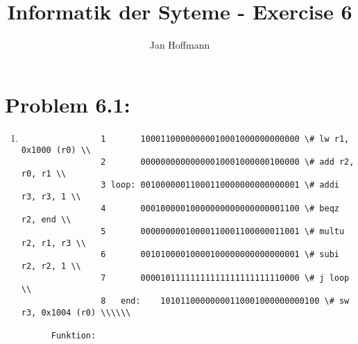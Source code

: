 \documentclass[10pt,a4paper]{article}
\title{Informatik der Syteme - Exercise 6}
\author{Jan Hoffmann}
\begin{document}
\section*{Problem 6.1:}
\begin{enumerate}
\item
\begin{verbatim}
				1       10001100000000010001000000000000 \# lw r1, 0x1000 (r0) \\
				2       00000000000000010001000000100000 \# add r2, r0, r1 \\
				3 loop: 00100000011000110000000000000001 \# addi r3, r3, 1 \\
				4       00010000010000000000000000001100 \# beqz r2, end \\
				5       00000000010000110001100000011001 \# multu r2, r1, r3 \\
				6       00101000010000100000000000000001 \# subi r2, r2, 1 \\
				7       00001011111111111111111111110000 \# j loop \\
				8	end: 	10101100000000110001000000000100 \# sw r3, 0x1004 (r0) \\\\\\
	
	  Funktion: 
				
\end{verbatim} 		
\end{enumerate}
\end{document}
